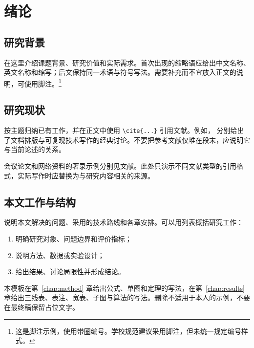 \chapter{绪论}
\label{chap:introduction}

\section{研究背景}

在这里介绍课题背景、研究价值和实际需求。首次出现的缩略语应给出中文名称、英文名称和缩写；后文保持同一术语与符号写法。需要补充而不宜放入正文的说明，可使用脚注。\footnote{这是脚注示例，使用带圈编号。学校规范建议采用脚注，但未统一规定编号样式。}

\section{研究现状}

按主题归纳已有工作，并在正文中使用 \verb|\cite{...}| 引用文献。例如，\cite{lamport1994latex,knuth1984literate} 分别给出了文档排版与可复现技术写作的经典讨论。不要把参考文献仅堆在段末，应说明它与当前论述的关系。

会议论文和网络资料的著录示例分别见文献\cite{vaswani2017attention,latexproject}。此处只演示不同文献类型的引用格式，实际写作时应替换为与研究内容相关的来源。

\section{本文工作与结构}

说明本文解决的问题、采用的技术路线和各章安排。可以用列表概括研究工作：

\begin{enumerate}[label=(\arabic*)]
  \item 明确研究对象、问题边界和评价指标；
  \item 说明方法、数据或实验设计；
  \item 给出结果、讨论局限性并形成结论。
\end{enumerate}

本模板在第~\ref{chap:method} 章给出公式、单图和定理的写法，在第~\ref{chap:results} 章给出三线表、表注、宽表、子图与算法的写法。删除不适用于本人的示例，不要在最终稿保留占位文字。
